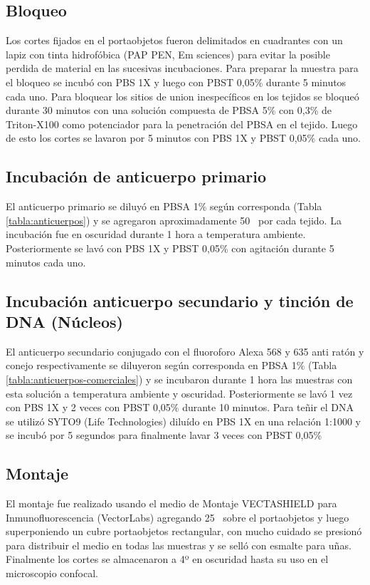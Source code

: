 \documentclass[12pt,letterpaper,oneside]{scrbook}
\begin{document}
\subsection{Bloqueo}

Los cortes fijados en el portaobjetos fueron delimitados en cuadrantes
con un lapiz con tinta hidrofóbica (PAP PEN, Em sciences) para evitar la
posible perdida de material en las sucesivas incubaciones. Para preparar
la muestra para el bloqueo se incubó con PBS 1X y luego con PBST 0,05\%
durante 5 minutos cada uno. Para bloquear los sitios de union
inespecíficos en los tejidos se bloqueó durante 30 minutos con una
solución compuesta de PBSA 5\% con 0,3\% de Triton-X100 como potenciador
para la penetración del PBSA en el tejido. Luego de esto los cortes se
lavaron por 5 minutos con PBS 1X y PBST 0,05\% cada uno.

\subsection{Incubación de anticuerpo primario}

El anticuerpo primario se diluyó en PBSA 1\% según corresponda (Tabla
\ref{tabla:anticuerpos}) y se agregaron aproximadamente
50\si{\micro\litro} por cada tejido. La incubación fue en oscuridad
durante 1 hora a temperatura ambiente. Posteriormente se lavó con PBS 1X
y PBST 0,05\% con agitación durante 5 minutos cada uno.

\subsection{Incubación anticuerpo secundario y tinción de DNA (Núcleos)}

El anticuerpo secundario conjugado con el fluoroforo Alexa 568 y 635
anti ratón y conejo respectivamente se diluyeron según corresponda en
PBSA 1\% (Tabla \ref{tabla:anticuerpos-comerciales}) y se incubaron
durante 1 hora las muestras con esta solución a temperatura ambiente y
oscuridad. Posteriormente se lavó 1 vez con PBS 1X y 2 veces con PBST
0,05\% durante 10 minutos. Para teñir el DNA se utilizó SYTO9 (Life
Technologies) diluído en PBS 1X en una relación 1:1000 y se incubó por 5
segundos para finalmente lavar 3 veces con PBST 0,05\%

\subsection{Montaje}

El montaje fue realizado usando el medio de Montaje VECTASHIELD para
Inmunofluorescencia (VectorLabs) agregando 25\si{\micro\litro} sobre el
portaobjetos y luego superponiendo un cubre portaobjetos rectangular,
con mucho cuidado se presionó para distribuir el medio en todas las
muestras y se selló con esmalte para uñas. Finalmente los cortes se
almacenaron a 4º en oscuridad hasta su uso en el microscopio confocal.
\end{document}
